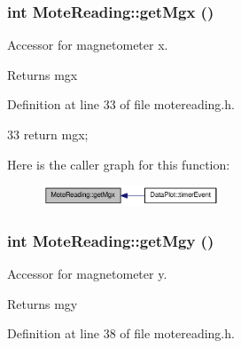 \hypertarget{classMoteReading_a318b7e6afba062ee3df207495070e277}{
\subsubsection[{getMgx}]{\setlength{\rightskip}{0pt plus 5cm}int MoteReading::getMgx ()}}
\label{classMoteReading_a318b7e6afba062ee3df207495070e277}


Accessor for magnetometer x. 

\begin{DoxyReturn}{Returns}
mgx 
\end{DoxyReturn}


Definition at line 33 of file motereading.h.




\begin{DoxyCode}
33 { return mgx; }
\end{DoxyCode}




Here is the caller graph for this function:\nopagebreak
\begin{figure}[H]
\begin{center}
\leavevmode
\includegraphics[width=149pt]{classMoteReading_a318b7e6afba062ee3df207495070e277_icgraph}
\end{center}
\end{figure}


\hypertarget{classMoteReading_a4344f67449dbd79febac0c4795b185f4}{
\subsubsection[{getMgy}]{\setlength{\rightskip}{0pt plus 5cm}int MoteReading::getMgy ()}}
\label{classMoteReading_a4344f67449dbd79febac0c4795b185f4}


Accessor for magnetometer y. 

\begin{DoxyReturn}{Returns}
mgy 
\end{DoxyReturn}


Definition at line 38 of file motereading.h.




